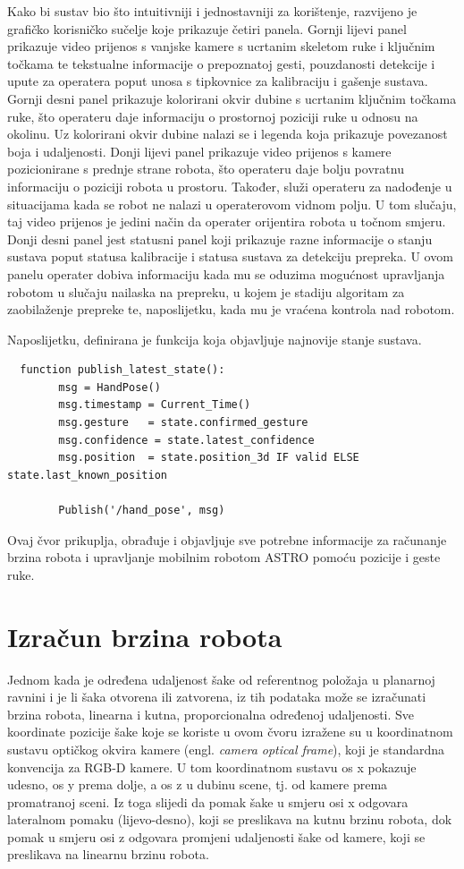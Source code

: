 \documentclass[12pt,a4paper,oneside]{report}
\begin{document}
Kako bi sustav bio što intuitivniji i jednostavniji za korištenje, razvijeno je grafičko korisničko sučelje 
koje prikazuje četiri panela. 
Gornji lijevi panel prikazuje video prijenos s vanjske kamere s ucrtanim skeletom ruke i ključnim točkama te 
tekstualne informacije o prepoznatoj gesti, pouzdanosti detekcije i upute za operatera poput unosa s tipkovnice 
za kalibraciju i gašenje sustava. 
Gornji desni panel prikazuje kolorirani okvir dubine s ucrtanim ključnim točkama ruke, što operateru daje 
informaciju o prostornoj poziciji ruke u odnosu na okolinu. Uz kolorirani okvir dubine nalazi se i legenda 
koja prikazuje povezanost boja i udaljenosti. 
Donji lijevi panel prikazuje video prijenos s kamere pozicionirane s prednje strane robota, što operateru 
daje bolju povratnu informaciju o poziciji robota u prostoru. Također, služi operateru za nadođenje u situacijama 
kada se robot ne nalazi u operaterovom vidnom polju. U tom slučaju, taj video prijenos je jedini način da 
operater orijentira robota u točnom smjeru. 
Donji desni panel jest statusni panel koji prikazuje razne informacije o stanju sustava poput statusa kalibracije i 
statusa sustava za detekciju prepreka. U ovom panelu operater dobiva informaciju kada mu se oduzima mogućnost upravljanja 
robotom u slučaju nailaska na prepreku, u kojem je stadiju algoritam za zaobilaženje prepreke te, naposlijetku, 
kada mu je vraćena kontrola nad robotom. 

Naposlijetku, definirana je funkcija koja objavljuje najnovije stanje sustava.

\begin{verbatim}
  function publish_latest_state():
        msg = HandPose()
        msg.timestamp = Current_Time()
        msg.gesture   = state.confirmed_gesture
        msg.confidence = state.latest_confidence
        msg.position  = state.position_3d IF valid ELSE state.last_known_position

        Publish('/hand_pose', msg)
\end{verbatim}

Ovaj čvor prikuplja, obrađuje i objavljuje sve potrebne informacije za računanje brzina robota i upravljanje 
mobilnim robotom ASTRO pomoću pozicije i geste ruke. 

\section{Izračun brzina robota}
Jednom kada je određena udaljenost šake od referentnog položaja u planarnoj ravnini i je li šaka otvorena 
ili zatvorena, iz tih podataka može se izračunati brzina robota, linearna i kutna, proporcionalna određenoj 
udaljenosti. Sve koordinate pozicije šake koje se koriste u ovom čvoru izražene su u koordinatnom sustavu 
optičkog okvira kamere (engl. \textit{camera optical frame}), koji je standardna konvencija za RGB-D kamere. 
U tom koordinatnom sustavu os x pokazuje udesno, os y prema dolje, a os z u dubinu scene, tj. od kamere 
prema promatranoj sceni. Iz toga slijedi da pomak šake u smjeru osi x odgovara lateralnom pomaku (lijevo-desno), 
koji se preslikava na kutnu brzinu robota, dok pomak u smjeru osi z odgovara promjeni udaljenosti šake od 
kamere, koji se preslikava na linearnu brzinu robota.
\end{document}
